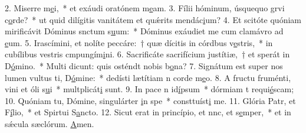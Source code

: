 2. Miserre m\uline{e}i,~* et exáudi oratónem m\uline{e}am.
3. Fílii hóminum, úsquequo grvi c\uline{o}rde?~* ut quid dilígitis vanitátem et quǽrits mendác\uline{i}um?
4. Et scitóte quóniam mirificávit Dóminus snctum s\uline{u}um:~* Dóminus exáudiet me cum clamávro ad \uline{e}um.
5. Irascímini, et nolíte peccáre:~† quæ dícitis in córdbus v\uline{e}stris,~* in cubílibus vestris cmpungím\uline{i}ni.
6. Sacrificáte sacrifícium justítiæ,~† et sperát in D\uline{ó}mino.~* Multi dicunt: quis osténdt nobis b\uline{o}na?
7. Signátum est super nos lumen vultus ti, D\uline{ó}mine:~* dedísti lætítiam n corde m\uline{e}o.
8. A fructu fruménti, vini et óli s\uline{u}i~* multplicát\uline{i} sunt.
9. In pace n id\uline{í}psum~* dórmiam t requi\uline{é}scam;
10. Quóniam tu, Dómine, singulárter \uline{i}n spe~* consttuíst\uline{i} me.
11. Glória Patr, et F\uline{í}lio,~* et Spirtui S\uline{a}ncto.
12. Sicut erat in princípio, et nnc, et s\uline{e}mper,~* et in sǽcula sæclórum. \uline{A}men.
